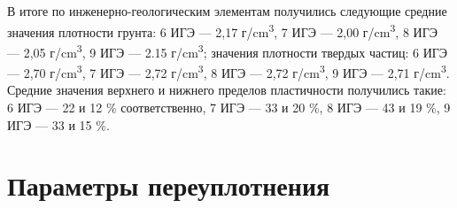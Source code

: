 
В итоге по инженерно-геологическим элементам получились следующие 
средние значения плотности грунта: 6 ИГЭ --- 2,17 г/\si{\centi\meter^3}, 
7 ИГЭ --- 2,00 г/\si{\centi\meter^3}, 8 ИГЭ --- 2,05 г/\si{\centi\meter^3}, 
9 ИГЭ --- 2.15 г/\si{\centi\meter^3}; значения плотности твердых 
частиц: 6 ИГЭ --- 2,70 г/\si{\centi\meter^3}, 7 ИГЭ --- 2,72 
г/\si{\centi\meter^3}, 8 ИГЭ --- 2,72 г/\si{\centi\meter^3}, 
9 ИГЭ --- 2,71 г/\si{\centi\meter^3}. 
Средние значения верхнего и нижнего пределов пластичности 
получились такие: 6 ИГЭ --- 22 и 12 \% соответственно, 7 ИГЭ 
--- 33 и 20 \%, 8 ИГЭ --- 43 и 19 \%, 9 ИГЭ --- 33 и 15 \%.


\section{Параметры переуплотнения}

